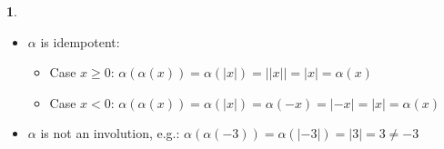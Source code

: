 \documentclass{article}
\theoremstyle{definition}
\newcommand{\abs}[1]{\left|#1\right|}
\theoremstyle{definition}
\theoremstyle{definition}
\newtheorem{solution-internal}{}[subsection]
\newenvironment{solution}{
  \begin{solution-internal}
}{
  \end{solution-internal}
}
\begin{document}
\begin{solution}
  $ $

  \begin{itemize}
    \item $\alpha$ is idempotent: 
      \begin{itemize}
        \item Case $x \geq 0$: $\alpha(\alpha(x)) = \alpha(\abs{x}) =
          \abs{|x|} = \abs{x} = \alpha(x)$
        \item Case $x < 0$: $\alpha(\alpha(x)) = \alpha(\abs{x}) = \alpha(-x) =
          \abs{-x} = \abs{x} = \alpha(x)$
      \end{itemize}
    \item $\alpha$ is not an involution, e.g.: $\alpha(\alpha(-3)) =
      \alpha(\abs{-3}) = \abs{3} = 3 \neq -3$
  \end{itemize}
\end{solution}
\end{document}
